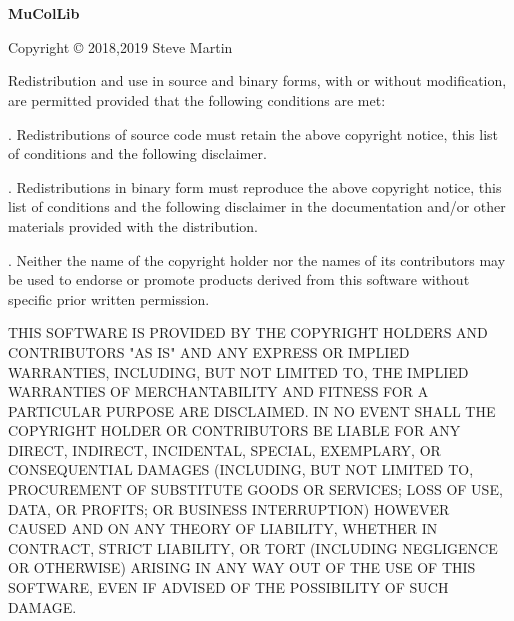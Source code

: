 \chapter*{}
\begin{center}
{\bf\large MuColLib}

Copyright \copyright{} 2018,2019 Steve Martin
\end{center}

Redistribution and use in source and binary forms, with or without modification, are permitted provided that the following conditions are met:

. Redistributions of source code must retain the above copyright notice, this list of conditions and the following disclaimer.
\bigskip

. Redistributions in binary form must reproduce the above copyright notice, this list of conditions and the following disclaimer in the documentation and/or other materials provided with the distribution.
\bigskip

. Neither the name of the copyright holder nor the names of its contributors may be used to endorse or promote products derived from this software without specific prior written permission.
\bigskip

THIS SOFTWARE IS PROVIDED BY THE COPYRIGHT HOLDERS AND CONTRIBUTORS "AS IS" AND ANY EXPRESS OR IMPLIED WARRANTIES, INCLUDING, BUT NOT LIMITED TO, THE IMPLIED WARRANTIES OF MERCHANTABILITY AND FITNESS FOR A PARTICULAR PURPOSE ARE DISCLAIMED. IN NO EVENT SHALL THE COPYRIGHT HOLDER OR CONTRIBUTORS BE LIABLE FOR ANY DIRECT, INDIRECT, INCIDENTAL, SPECIAL, EXEMPLARY, OR CONSEQUENTIAL DAMAGES (INCLUDING, BUT NOT LIMITED TO, PROCUREMENT OF SUBSTITUTE GOODS OR SERVICES; LOSS OF USE, DATA, OR PROFITS; OR BUSINESS INTERRUPTION) HOWEVER CAUSED AND ON ANY THEORY OF LIABILITY, WHETHER IN CONTRACT, STRICT LIABILITY, OR TORT (INCLUDING NEGLIGENCE OR OTHERWISE) ARISING IN ANY WAY OUT OF THE USE OF THIS SOFTWARE, EVEN IF ADVISED OF THE POSSIBILITY OF SUCH DAMAGE.

